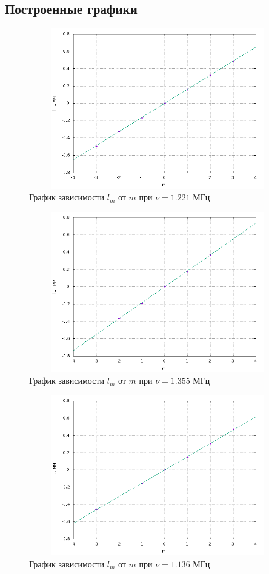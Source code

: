 \documentclass[12pt]{article}
\begin{document}
\subsection*{Построенные графики}
\begin{figure}[h!]
	\centering
	\includegraphics[width = 12cm, height = 7cm]{plot1.png}
	\caption{График зависимости $l_m$ от $m$ при $\nu = 1.221$ МГц}
\end{figure}
\begin{figure}[h!]
	\centering
	\includegraphics[width = 12cm, height = 7cm]{plot3.png}
	\caption{График зависимости $l_m$ от $m$ при $\nu = 1.355$ МГц}
\end{figure}
\newpage
\begin{figure}[h!]
	\centering
	\includegraphics[width = 12cm, height = 7cm]{plot2.png}
	\caption{График зависимости $l_m$ от $m$ при $\nu = 1.136$ МГц}
\end{figure}
\end{document}
